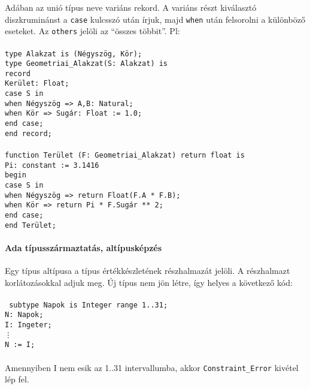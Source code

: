 \documentclass[fleqn,10pt,a4paper]{article}
\newcommand{\ut}[1]{\texttt{#1}}
\newcommand{\utt}[1]{\\\ut{#1}}
\theoremstyle{magyar}
\begin{document}
  Adában az unió típus neve variáns rekord. A variáns részt kiválasztó
  diszkruminánst a \ut{case} kulcsszó után írjuk, majd \ut{when} után
  felsorolni a különböző eseteket. Az \ut{others} jelöli az ``összes
  többit''. Pl:\\
  \ut{\\ 
    type Alakzat is (Négyszög, Kör);\\
    type Geometriai\_Alakzat(S: Alakzat) is\\
    \hspace*{1em}record\\
    \hspace*{2em}Kerület: Float;\\
    \hspace*{2em}case S in\\
    \hspace*{3em}when Négyszög => A,B: Natural;\\
    \hspace*{3em}when Kör => Sugár: Float := 1.0;\\
    \hspace*{2em}end case;\\
    \hspace*{1em}end record;\\
    \\
    function Terület (F: Geometriai\_Alakzat) return float is\\
    \hspace*{1.5em}Pi: constant := 3.1416\\
    begin\\
    \hspace*{1.5em}case S in\\
    \hspace*{2.5em}when Négyszög => return Float(F.A * F.B);\\
    \hspace*{2.5em}when Kör => return Pi * F.Sugár ** 2;\\
    \hspace*{1.5em}end case;\\
    end Terület;
  }
  
  \paragraph{Ada típusszármaztatás, altípusképzés}
  Egy típus altípusa a típus értékkészletének részhalmazát
  jelöli. A részhalmazt korlátozásokkal adjuk meg. Új típus nem jön
  létre, így helyes a következő kód:\\
  \utt{
    subtype Napok is Integer range 1..31;\\
    N: Napok;\\
    I: Ingeter;\\
    \vdots\\
    N := I;\\}\\
  Amennyiben I nem esik az 1..31 intervallumba, akkor
  \ut{Constraint\_Error} kivétel lép fel.
  
\end{document}
